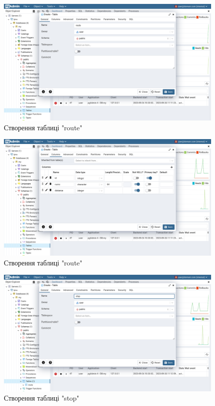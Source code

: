 \documentclass[14pt]{extreport}
\begin{document}
\begin{normalsize}
	\iffalse
	\begin{figure}[H]
		\centering
		\includegraphics[scale=0.35]{20}
		\caption{Створення таблиці "route"}
	\end{figure}
	
	\begin{figure}[H]
		\centering
		\includegraphics[scale=0.35]{21}
		\caption{Створення таблиці "route"}
	\end{figure}

	\begin{figure}[H]
		\centering
		\includegraphics[scale=0.35]{22}
		\caption{Створення таблиці "stop"}
	\end{figure}
	

\end{normalsize}
\end{document}
